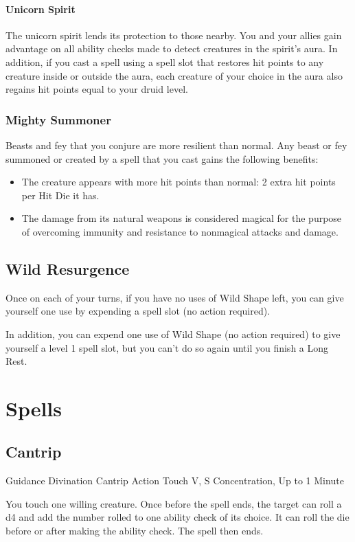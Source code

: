 \documentclass[letterpaper,openany,oneside,twocolumn]{book}
\begin{document}
\paragraph*{Unicorn Spirit} The unicorn spirit lends its protection to those nearby. You and your allies gain advantage on all ability checks made to detect creatures in the spirit's aura. In addition, if you cast a spell using a spell slot that restores hit points to any creature inside or outside the aura, each creature of your choice in the aura also regains hit points equal to your druid level.
\subsubsection*{Mighty Summoner}
Beasts and fey that you conjure are more resilient than normal. Any beast or fey summoned or created by a spell that you cast gains the following benefits:
\begin{itemize}
	\item The creature appears with more hit points than normal: 2 extra hit points per Hit Die it has.
	\item The damage from its natural weapons is considered magical for the purpose of overcoming immunity and resistance to nonmagical attacks and damage.
\end{itemize}

\subsection*{Wild Resurgence}
Once on each of your turns, if you have no uses of Wild Shape left, you can give yourself one use by expending a spell slot (no action required).

In addition, you can expend one use of Wild Shape (no action required) to give yourself a level 1 spell slot, but you can't do so again until you finish a Long Rest.

\section*{Spells}
\subsection*{Cantrip}

\DndSpellHeader
  {Guidance}
  {Divination Cantrip}
  {Action}
  {Touch}
  {V, S}
  {Concentration, Up to 1 Minute}

You touch one willing creature. Once before the spell ends, the target can roll a d4 and add the number rolled to one ability check of its choice. It can roll the die before or after making the ability check. The spell then ends.
\end{document}
